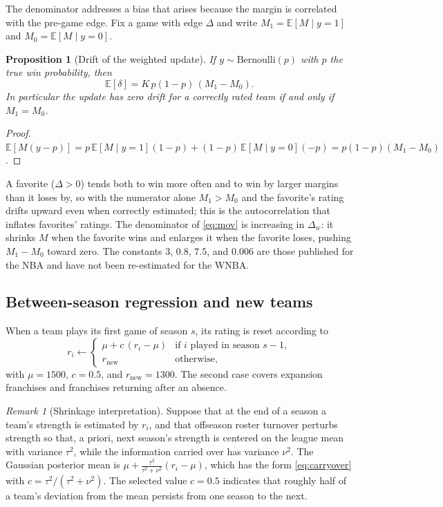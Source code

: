 \documentclass[11pt]{article}
\newcommand{\carry}{0.5}           %
\newcommand{\rnew}{1300}           %
\newcommand{\rmean}{1500}          %
\newcommand{\E}{\mathbb{E}}
\theoremstyle{plain}
\newtheorem{proposition}{Proposition}
\theoremstyle{definition}
\theoremstyle{remark}
\newtheorem{remark}{Remark}
\begin{document}
The denominator addresses a bias that arises because the margin is correlated with the pre-game edge. Fix a game with edge $\Delta$ and write $M_1 = \E[M \mid y=1]$ and $M_0 = \E[M \mid y = 0]$.

\begin{proposition}[Drift of the weighted update]\label{prop:drift}
If $y \sim \mathrm{Bernoulli}(p)$ with $p$ the true win probability, then
\[
  \E[\delta] = K\,p(1-p)\,(M_1 - M_0).
\]
In particular the update has zero drift for a correctly rated team if and only if $M_1 = M_0$.
\end{proposition}
\begin{proof}
$\E[M(y-p)] = p\,\E[M\mid y=1](1-p) + (1-p)\,\E[M \mid y = 0](-p) = p(1-p)(M_1 - M_0)$.
\end{proof}

A favorite ($\Delta > 0$) tends both to win more often and to win by larger margins than it loses by, so with the numerator alone $M_1 > M_0$ and the favorite's rating drifts upward even when correctly estimated; this is the autocorrelation that inflates favorites' ratings. The denominator of \eqref{eq:mov} is increasing in $\Delta_w$: it shrinks $M$ when the favorite wins and enlarges it when the favorite loses, pushing $M_1 - M_0$ toward zero. The constants $3$, $0.8$, $7.5$, and $0.006$ are those published for the NBA and have not been re-estimated for the WNBA.

\subsection{Between-season regression and new teams}

When a team plays its first game of season $s$, its rating is reset according to
\begin{equation}\label{eq:carryover}
  r_i \leftarrow
  \begin{cases}
    \mu + c\,(r_i - \mu) & \text{if $i$ played in season } s-1,\\
    r_{\mathrm{new}} & \text{otherwise},
  \end{cases}
\end{equation}
with $\mu = \rmean$, $c = \carry$, and $r_{\mathrm{new}} = \rnew$. The second case covers expansion franchises and franchises returning after an absence.

\begin{remark}[Shrinkage interpretation]
Suppose that at the end of a season a team's strength is estimated by $r_i$, and that offseason roster turnover perturbs strength so that, a priori, next season's strength is centered on the league mean with variance $\tau^2$, while the information carried over has variance $\nu^2$. The Gaussian posterior mean is $\mu + \frac{\tau^2}{\tau^2 + \nu^2}(r_i - \mu)$, which has the form \eqref{eq:carryover} with $c = \tau^2/(\tau^2+\nu^2)$. The selected value $c = \carry$ indicates that roughly half of a team's deviation from the mean persists from one season to the next.
\end{remark}
\end{document}
